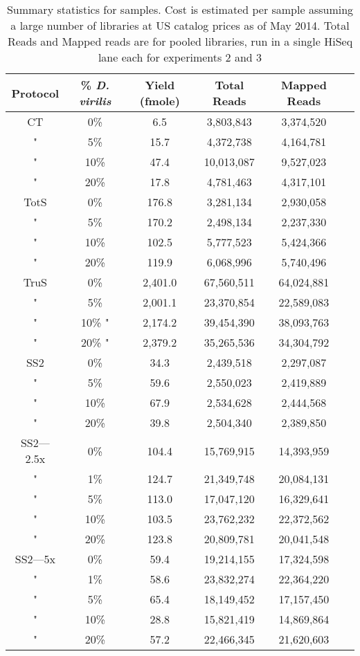 \begin{table}[htdp]

\caption{Summary statistics for samples. Cost is estimated per sample assuming a
     large number of libraries at US catalog prices as of May 2014. Total Reads
     and Mapped reads are for pooled libraries, run in a single HiSeq lane each
     for experiments 2 and 3}
\begin{center}
\begin{tabular}{|c|c|c|c|c|c|} \hline
Protocol & \% {\em D. virilis}  &  Yield (fmole) & Total Reads & Mapped Reads \\\hline 
CT & 0\%  & 6.5  & 3,803,843 &3,374,520 \\
" & 5\%  & 15.7  & 4,372,738 &4,164,781 \\
" & 10\%  & 47.4  & 10,013,087 &9,527,023 \\
" & 20\%  & 17.8  & 4,781,463 &4,317,101 \\
TotS & 0\%  & 176.8  & 3,281,134 &2,930,058 \\
" & 5\%  & 170.2  & 2,498,134 &2,237,330 \\
" & 10\%  & 102.5  & 5,777,523 &5,424,366 \\
" & 20\%  & 119.9  & 6,068,996 &5,740,496 \\
TruS & 0\%  & 2,401.0  & 67,560,511 &64,024,881 \\
" & 5\%  & 2,001.1  & 23,370,854 &22,589,083 \\
" & 10\% " & 2,174.2  & 39,454,390 &38,093,763 \\
" & 20\% " & 2,379.2  & 35,265,536 &34,304,792 \\
SS2 & 0\% & 34.3  & 2,439,518 &2,297,087 \\
" & 5\% & 59.6  & 2,550,023 &2,419,889 \\
" & 10\% & 67.9  & 2,534,628 &2,444,568 \\
" & 20\% & 39.8  & 2,504,340 &2,389,850 \\
SS2---2.5x & 0\% & 104.4  & 15,769,915 &14,393,959 \\
" & 1\% & 124.7  & 21,349,748 &20,084,131 \\
" & 5\% & 113.0  & 17,047,120 &16,329,641 \\
" & 10\% & 103.5  & 23,762,232 &22,372,562 \\
" & 20\% & 123.8  & 20,809,781 &20,041,548 \\
SS2---5x & 0\% & 59.4  & 19,214,155 &17,324,598 \\
" & 1\% & 58.6  & 23,832,274 &22,364,220 \\
" & 5\% & 65.4  & 18,149,452 &17,157,450 \\
" & 10\% & 28.8  & 15,821,419 &14,869,864 \\
" & 20\% & 57.2  & 22,466,345 &21,620,603 \\
\hline

\end{tabular}
\label{tab:protocols}
\end{center}
\end{table}
      